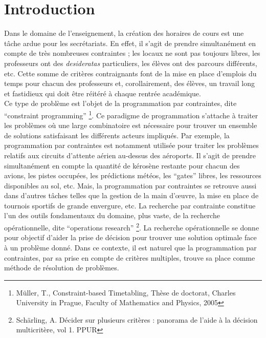 

\chapter*{Introduction}

Dans le domaine de l'enseignement, la création des horaires de cours est une tâche ardue pour les secrétariats. En effet, il s'agit de prendre simultanément en compte de très nombreuses contraintes ; les locaux ne sont pas toujours libres, les professeurs ont des \textit{desideratas} particuliers, les élèves ont des parcours différents, etc. Cette somme de critères contraignants font de la mise en place d'emplois du temps pour chacun des professeurs et, corollairement, des élèves, un travail long et fastidieux qui doit être réitéré à chaque rentrée académique.\\
\newline
\indent
Ce type de problème est l'objet de la programmation par contraintes, dite \enquote{constraint programming} \footnote{Müller, T., Constraint-based Timetabling, Thèse de doctorat, Charles University in Prague, Faculty of Mathematics and Physics, 2005}. Ce paradigme de programmation s'attache à traiter les problèmes où une large combinatoire est nécessaire pour trouver un ensemble de solutions satisfaisant les différents acteurs impliqués. Par exemple, la programmation par contraintes est notamment utilisée pour traiter les problèmes relatifs aux circuits d'attente aérien au-dessus des aéroports. Il s'agit de prendre simultanément en compte la quantité de kérosène restante pour chacun des avions, les pistes occupées, les prédictions météos, les \enquote{gates} libres, les ressources disponibles au sol, etc. Mais, la programmation par contraintes se retrouve aussi dans d'autres tâches telles que la gestion de la main d’œuvre, la mise en place de tournois sportifs de grande envergure, etc.
\newline
\indent
La recherche par contrainte constitue l'un des outils fondamentaux du domaine, plus vaste, de la 
recherche opérationnelle, dite \enquote{operations research} \footnote{Schärling, A. Décider sur plusieurs critères : panorama de l'aide à la décision multicritère, vol 1. PPUR}. La recherche opérationnelle se donne pour objectif d'aider la prise de décision pour trouver une solution optimale face à un problème donné. Dans ce contexte, il est naturel que la programmation par contraintes, par sa prise en compte de critères multiples, trouve sa place comme méthode de résolution de problèmes.\\
